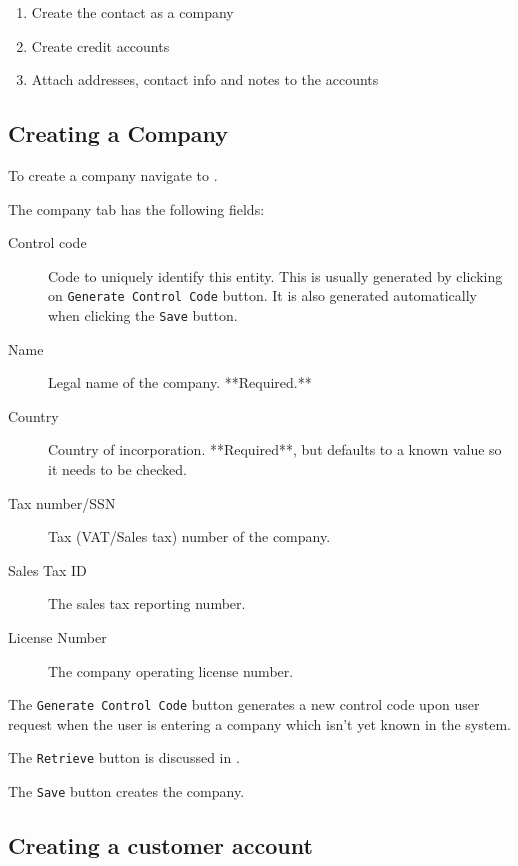\begin{enumerate}
\item Create the \gls{contact} as a company
\item Create \glspl{credit account}
\item Attach addresses, contact info and notes to the accounts
\end{enumerate}

\subsection{Creating a Company}
\label{subsec-business-processes-customer-creating-company}

To create a company navigate to .

The company tab has the following fields:

\begin{description}
\item [Control code] Code to uniquely identify this entity.  This is usually generated by clicking on \texttt{Generate Control Code} button.  It is also generated automatically when clicking the \texttt{Save} button.
\item [Name] Legal name of the company. **Required.**
\item [Country] Country of incorporation. **Required**, but defaults to a known value so it needs to be checked.
\item [Tax number/SSN] Tax (VAT/Sales tax) number of the company.
\item [Sales Tax ID] The sales tax reporting number.
\item [License Number] The company operating license number.
\end{description}

The \texttt{Generate Control Code} button generates a new control code upon
user request when the user is entering a company which isn't yet known
in the system.

The \texttt{Retrieve} button is discussed in .

The \texttt{Save} button creates the company.

\subsection{Creating a customer account}
\label{subsec-business-processes-customers-creating-account}

